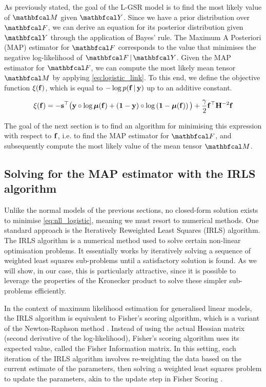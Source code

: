 As previously stated, the goal of the L-GSR model is to find the most likely value of $\Mt$ given $\Yt$. Since we have a prior distribution over $\Ft$, we can derive an equation for its posterior distribution given $\Yt$ through the application of Bayes' rule. The Maximum A Posteriori (MAP) estimator for $\Ft$ corresponds to the value that minimises the negative log-likelihood of $\Ft \, | \, \Yt$. Given the MAP estimator for $\Ft$, we can compute the most likely mean tensor $\Mt$ by applying \cref{eq:logistic_link}. To this end, we define the objective function $\xi(\mathbf{f})$, which is equal to $-\log p(\mathbf{f} \, | \, \mathbf{y})$ up to an additive constant.
 
\begin{equation}
    \label{eq:nll_logistic}
    \xi(\mathbf{f}) = -\mathbf{s}^\top \big(\mathbf{y} \circ \log \boldsymbol{\mu}(\mathbf{f}) + \left(\mathbf{1}  - \mathbf{y}\right) \circ \log \left(\mathbf{1} - \boldsymbol{\mu}(\mathbf{f}) \right)\big) + \frac{\gamma}{2} \mathbf{f}^\top \mathbf{H}^{-2} \mathbf{f}
\end{equation}

The goal of the next section is to find an algorithm for minimising this expression with respect to $\mathbf{f}$, i.e. to find the MAP estimator for $\Ft$, and subsequently compute the most likely value of the mean tensor $\Mt$. 


\subsection{Solving for the MAP estimator with the IRLS algorithm}

Unlike the normal models of the previous sections, no closed-form solution exists to minimise \cref{eq:nll_logistic}, meaning we must resort to numerical methods. One standard approach is the Iteratively Reweighted Least Squares (IRLS) algorithm. The IRLS algorithm is a numerical method used to solve certain non-linear optimisation problems. It essentially works by iteratively solving a sequence of weighted least squares sub-problems until a satisfactory solution is found. As we will show, in our case, this is particularly attractive, since it is possible to leverage the properties of the Kronecker product to solve these simpler sub-problems efficiently. 

In the context of maximum likelihood estimation for generalised linear models, the IRLS algorithm is equivalent to Fisher's scoring algorithm, which is a variant of the Newton-Raphson method \citep{Nelder1972}. Instead of using the actual Hessian matrix (second derivative of the log-likelihood), Fisher's scoring algorithm uses its expected value, called the Fisher Information matrix. In this setting, each iteration of the IRLS algorithm involves re-weighting the data based on the current estimate of the parameters, then solving a weighted least squares problem to update the parameters, akin to the update step in Fisher Scoring \citep{Fan2020}.

